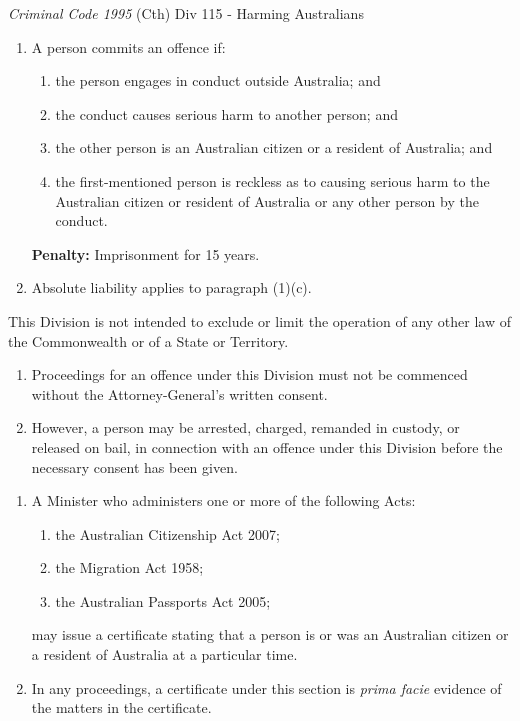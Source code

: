 \begin{statutedetails}{\textit{Criminal Code 1995} (Cth) Div 115 - Harming Australians}
    \begin{enumerate}[label=(\arabic*)]
        \item A person commits an offence if:
        \begin{enumerate}[label=(\alph*)]
            \item the person engages in conduct outside Australia; and
            \item the conduct causes serious harm to another person; and
            \item the other person is an Australian citizen or a resident of Australia; and
            \item the first-mentioned person is reckless as to causing serious harm to the Australian citizen or resident of Australia or any other person by the conduct.
        \end{enumerate}
        \par \textbf{Penalty:} Imprisonment for 15 years.
        \item Absolute liability applies to paragraph (1)(c).
    \end{enumerate}

    This Division is not intended to exclude or limit the operation of any other law of the Commonwealth or of a State or Territory.

    \begin{enumerate}[label=(\arabic*)]
        \item Proceedings for an offence under this Division must not be commenced without the Attorney-General's written consent.
        \item However, a person may be arrested, charged, remanded in custody, or released on bail, in connection with an offence under this Division before the necessary consent has been given.
    \end{enumerate}

    \begin{enumerate}[label=(\arabic*)]
        \item A Minister who administers one or more of the following Acts:
        \begin{enumerate}[label=(\alph*)]
            \item the Australian Citizenship Act 2007;
            \item the Migration Act 1958;
            \item the Australian Passports Act 2005;
        \end{enumerate}
        may issue a certificate stating that a person is or was an Australian citizen or a resident of Australia at a particular time.
        \item In any proceedings, a certificate under this section is \textit{prima facie} evidence of the matters in the certificate.
    \end{enumerate}


\end{statutedetails}
